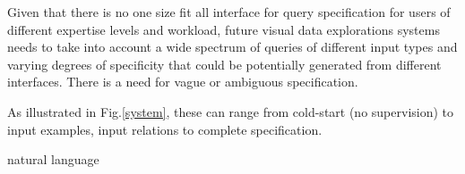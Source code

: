 \par Given that there is no one size fit all interface for query specification for users of different expertise levels and workload, future visual data explorations systems needs to take into account a wide spectrum of queries of different input types and varying degrees of specificity that could be potentially generated from different interfaces. There is a need for 
vague or ambiguous specification. 

As illustrated in Fig.\ref{system}, these can range from cold-start (no supervision) to input examples, input relations to complete specification.
\par natural language
